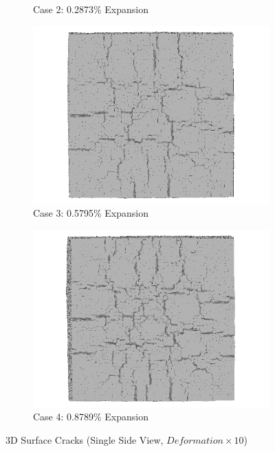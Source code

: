 \begin{figure}[!h]
\begin{subfigure}{.5\textwidth}
    \caption{Case 2: 0.2873\% Expansion}
    \end{subfigure}%
    \begin{subfigure}{.5\textwidth}
      \centering
      \includegraphics[width=.8\linewidth]{Files/exp_3D/DEF/A30X0C_3_3ds.png}
    \caption{Case 3: 0.5795\% Expansion}
    \end{subfigure}
    \begin{subfigure}{.5\textwidth}
      \centering
      \includegraphics[width=.8\linewidth]{Files/exp_3D/DEF/A30X0C_4_3ds.png}
    \caption{Case 4: 0.8789\% Expansion}
    \end{subfigure}%

  \caption{3D Surface Cracks (Single Side View, $Deformation \times 10$)}
  \label{fig:DEF_A30X0C_3DS}
\end{figure}

